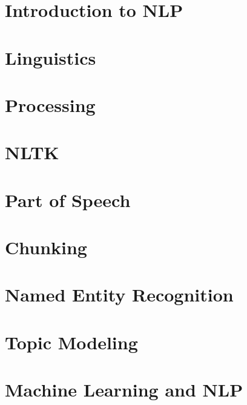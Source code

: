 \section[Intro]{Introduction to NLP}


\section[Ling]{Linguistics}

\section[Pre]{Processing}

\section[NLTK]{NLTK}


\section[POS]{Part of Speech}



\section[Chunk]{Chunking}


\section[NER]{Named Entity Recognition}




\section[Topics]{Topic Modeling}


\section[MLNLP]{Machine Learning and NLP}
 

